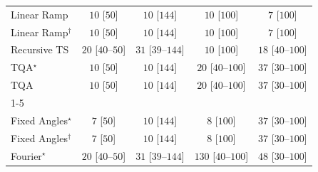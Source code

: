 \begin{tabular}{l|cccc|}
Linear Ramp & {\cellcolor[HTML]{F7FCF5}} \color[HTML]{000000} $10$ [$50$] & {\cellcolor[HTML]{F7FCF5}} \color[HTML]{000000} $10$ [$144$] & {\cellcolor[HTML]{F7FCF5}} \color[HTML]{000000} $10$ [$100$] & {\cellcolor[HTML]{F7FCF5}} \color[HTML]{000000} $7$ [$100$] \\
Linear Ramp$^\dagger$ & {\cellcolor[HTML]{F7FCF5}} \color[HTML]{000000} $10$ [$50$] & {\cellcolor[HTML]{F7FCF5}} \color[HTML]{000000} $10$ [$144$] & {\cellcolor[HTML]{F7FCF5}} \color[HTML]{000000} $10$ [$100$] & {\cellcolor[HTML]{F7FCF5}} \color[HTML]{000000} $7$ [$100$] \\
Recursive TS & {\cellcolor[HTML]{F5FBF2}} \color[HTML]{000000} $20$ [$40$--$50$] & {\cellcolor[HTML]{F3FAF0}} \color[HTML]{000000} $31$ [$39$--$144$] & {\cellcolor[HTML]{F7FCF5}} \color[HTML]{000000} $10$ [$100$] & {\cellcolor[HTML]{F5FBF3}} \color[HTML]{000000} $18$ [$40$--$100$] \\
TQA$^\star$ & {\cellcolor[HTML]{F7FCF5}} \color[HTML]{000000} $10$ [$50$] & {\cellcolor[HTML]{F7FCF5}} \color[HTML]{000000} $10$ [$144$] & {\cellcolor[HTML]{F5FBF2}} \color[HTML]{000000} $20$ [$40$--$100$] & {\cellcolor[HTML]{F2FAEF}} \color[HTML]{000000} $37$ [$30$--$100$] \\
TQA & {\cellcolor[HTML]{F7FCF5}} \color[HTML]{000000} $10$ [$50$] & {\cellcolor[HTML]{F7FCF5}} \color[HTML]{000000} $10$ [$144$] & {\cellcolor[HTML]{F5FBF2}} \color[HTML]{000000} $20$ [$40$--$100$] & {\cellcolor[HTML]{F2FAEF}} \color[HTML]{000000} $37$ [$30$--$100$] \\
\cline{1-5}
\multicolumn{5}{c}{\rule{0pt}{8pt}PP} \\
\midrule
Fixed Angles$^\star$ & {\cellcolor[HTML]{F7FCF5}} \color[HTML]{000000} $7$ [$50$] & {\cellcolor[HTML]{F7FCF5}} \color[HTML]{000000} $10$ [$144$] & {\cellcolor[HTML]{F7FCF5}} \color[HTML]{000000} $8$ [$100$] & {\cellcolor[HTML]{F2FAEF}} \color[HTML]{000000} $37$ [$30$--$100$] \\
Fixed Angles$^\dagger$ & {\cellcolor[HTML]{F7FCF5}} \color[HTML]{000000} $7$ [$50$] & {\cellcolor[HTML]{F7FCF5}} \color[HTML]{000000} $10$ [$144$] & {\cellcolor[HTML]{F7FCF5}} \color[HTML]{000000} $8$ [$100$] & {\cellcolor[HTML]{F2FAEF}} \color[HTML]{000000} $37$ [$30$--$100$] \\
Fourier$^\star$ & {\cellcolor[HTML]{F5FBF2}} \color[HTML]{000000} $20$ [$40$--$50$] & {\cellcolor[HTML]{F3FAF0}} \color[HTML]{000000} $31$ [$39$--$144$] & {\cellcolor[HTML]{DFF3DA}} \color[HTML]{000000} $130$ [$40$--$100$] & {\cellcolor[HTML]{F0F9ED}} \color[HTML]{000000} $48$ [$30$--$100$] \\

\end{tabular}

